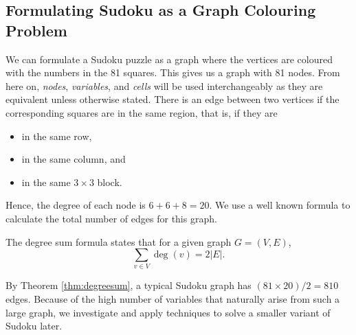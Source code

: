 \documentclass[../main.tex]{subfiles}
\begin{document}
        \subsection{Formulating Sudoku as a Graph Colouring Problem}
        We can formulate a Sudoku puzzle as a graph where the vertices are coloured with the numbers in the 81 squares. This gives us a graph with 81 nodes. From here on, \emph{nodes}, \emph{variables}, and \emph{cells} will be used interchangeably as they are equivalent unless otherwise stated. There is an edge between two vertices if the corresponding squares are in the same region, that is, if they are 
        \begin{itemize}
            \item in the same row,
            \item in the same column, and 
            \item in the same $3\times 3$ block.            
        \end{itemize}
        Hence, the degree of each node is $6+6+8=20$. We use a well known formula to calculate the total number of edges for this graph.        
        \begin{theorem} \label{thm:degreesum}
            The degree sum formula states that for a given graph $G=(V,E)$,
            $$\sum_{v\in V}\deg(v)=2|E|.$$
        \end{theorem}
        By Theorem \ref{thm:degreesum}, a typical Sudoku graph has $(81\times 20)/2=810$ edges. Because of the high number of variables that naturally arise from such a large graph, we investigate and apply techniques to solve a smaller variant of Sudoku later.
\end{document}
